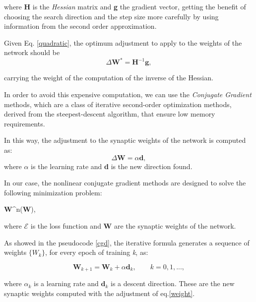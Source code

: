 		where \textbf{H} is the \textit{Hessian} matrix and \textbf{g} the gradient vector, getting the benefit of choosing the search direction and the step size more carefully by using information from the second order approximation.

		Given Eq. \ref{quadratic}, the optimum adjustment to apply to the weights of the network should be
 		\begin{equation}
		 	\label{weight_star}
			\Delta\textbf{W}^* = \textbf{H}^{-1}\textbf{g},
		\end{equation}

		carrying the weight of the computation of the inverse of the Hessian.

		In order to avoid this expensive computation, we can use the \textit{Conjugate Gradient} methods, which are a class of iterative second-order optimization methods, derived from the steepest-descent algorithm, that ensure low memory requirements.

		In this way, the adjustment to the synaptic weights of the network is computed as:
		 \begin{equation}
		 	\label{weight}
		    \Delta\textbf{W} = \alpha\textbf{d},
		 \end{equation}
		where $\alpha$ is the learning rate and \textbf{d} is the new direction found.

		In our case, the nonlinear conjugate gradient methods are designed to solve the following minimization problem:

		\begin{mini}
		  {\textbf{W}\in {}^n}{(\textbf{W}),}{}{}
		\end{mini}

		where $\mathcal{E}$ is the loss function and \textbf{W} are the synaptic weights of the network.

		As showed in the pseudocode \ref{cgd}, the iterative formula generates a sequence of weights $\{W_k\}$, for every epoch of training \textit{k}, as:

		\begin{equation}
			\textbf{W}_{k+1} = \textbf{W}_{k} + \alpha\textbf{d}_k, \text{  }\text{  }\text{  } \textit{k} = 0,1,...,
		\end{equation}

		where $\alpha_k$ is a learning rate and $\textbf{d}_k$ is a descent direction. These are the new synaptic weights computed with the adjustment of eq.\ref{weight}.



